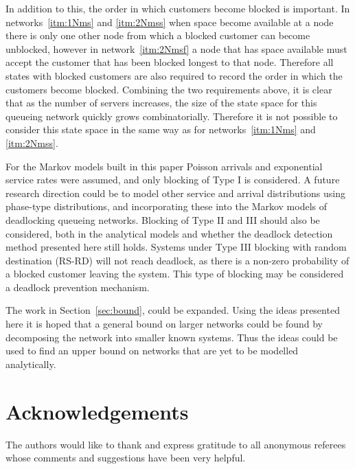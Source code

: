 \documentclass{article}
\numberwithin{equation}{section}
\begin{document}
In addition to this, the order in which customers become blocked is important.
In networks~\ref{itm:1Nms} and \ref{itm:2Nmss} when space become available at
a node there is only one other node from which a blocked customer can become
unblocked, however in network~\ref{itm:2Nmsf} a node that has space available
must accept the customer that has been blocked longest to that node.
Therefore all states with blocked customers are also required to record the
order in which the customers become blocked.
Combining the two requirements above, it is clear that as the number of
servers increases, the size of the state space for this queueing network
quickly grows combinatorially.
Therefore it is not possible to consider this state space in the same way as
for networks~\ref{itm:1Nms} and \ref{itm:2Nmss}.

For the Markov models built in this paper Poisson arrivals and exponential
service rates were assumed, and only blocking of Type I is considered.
A future research direction could be to model other service and arrival
distributions using phase-type distributions, and incorporating these into the
Markov models of deadlocking queueing networks.
Blocking of Type II and III should also be considered, both in the analytical
models and whether the deadlock detection method presented here still holds.
Systems under Type III blocking with random destination (RS-RD) will not reach
deadlock, as there is a non-zero probability of a blocked customer leaving the
system.
This type of blocking may be considered a deadlock prevention mechanism.

The work in Section~\ref{sec:bound}, could be expanded.
Using the ideas presented here it is hoped that a general bound on larger
networks could be found by decomposing the network into smaller known systems.
Thus the ideas could be used to find an upper bound on networks that are yet
to be modelled analytically.

\section{Acknowledgements}

The authors would like to thank and express gratitude to all anonymous
referees whose comments and suggestions have been very helpful.



\end{document}
